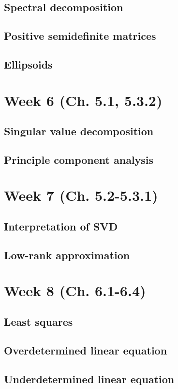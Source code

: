 \documentclass{article}
\begin{document}
    \subsection{Spectral decomposition}
    \subsection{Positive semidefinite matrices}
    \subsection{Ellipsoids}

\section{Week 6 (Ch. 5.1, 5.3.2)}
    \subsection{Singular value decomposition}
    \subsection{Principle component analysis}

\section{Week 7 (Ch. 5.2-5.3.1)}
    \subsection{Interpretation of SVD}
    \subsection{Low-rank approximation}

\section{Week 8 (Ch. 6.1-6.4)}
    \subsection{Least squares}
    \subsection{Overdetermined linear equation}
    \subsection{Underdetermined linear equation}
\end{document}
